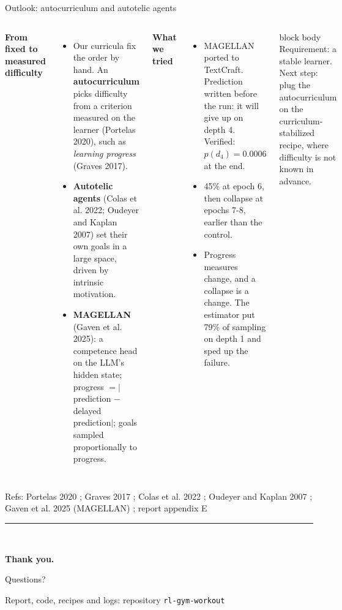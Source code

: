 \documentclass[aspectratio=169,10pt]{beamer}
\newcommand{\refs}[1]{\vfill{\tiny\textcolor{crMid}{Refs: #1}}}
\newenvironment{keymsg}{\begin{beamercolorbox}[sep=6pt,wd=\textwidth]{block body}\small}{\end{beamercolorbox}}
\begin{document}
\begin{frame}{Outlook: autocurriculum and autotelic agents}
\begin{columns}[T]
\textbf{From fixed to measured difficulty}
\begin{itemize}
  \item Our curricula fix the order by hand. An \textbf{autocurriculum} picks difficulty from a criterion measured on the learner (Portelas 2020), such as \emph{learning progress} (Graves 2017).
  \item \textbf{Autotelic agents} (Colas et al. 2022; Oudeyer and Kaplan 2007) set their own goals in a large space, driven by intrinsic motivation.
  \item \textbf{MAGELLAN} (Gaven et al. 2025): a competence head on the LLM's hidden state; progress $= |$prediction $-$ delayed prediction$|$; goals sampled proportionally to progress.
\end{itemize}
\textbf{What we tried}
\begin{itemize}
  \item MAGELLAN ported to TextCraft. Prediction written before the run: it will give up on depth 4. Verified: $p(d_4)=0.0006$ at the end.
  \item 45\% at epoch 6, then collapse at epochs 7-8, earlier than the control.
  \item Progress measures change, and a collapse is a change. The estimator put 79\% of sampling on depth 1 and sped up the failure.
\end{itemize}
\begin{keymsg}
Requirement: a stable learner. Next step: plug the autocurriculum on the curriculum-stabilized recipe, where difficulty is not known in advance.
\end{keymsg}
\end{columns}
\refs{Portelas 2020 ; Graves 2017 ; Colas et al. 2022 ; Oudeyer and Kaplan 2007 ; Gaven et al. 2025 (MAGELLAN) ; report appendix E}
\end{frame}

{
\begin{frame}[plain]
  \vfill
  \begin{center}
    {\color{crOrange}\rule{2.4cm}{3pt}}\\[0.6cm]
    {\color{white}\fontsize{26}{30}\selectfont\bfseries Thank you.\par}
    \vspace{0.4cm}
    {\color{white}\large Questions?\par}
    \vspace{1cm}
    {\color{crMid}\small Report, code, recipes and logs: repository \texttt{rl-gym-workout}}
  \end{center}
  \vfill
\end{frame}
}
\end{document}

